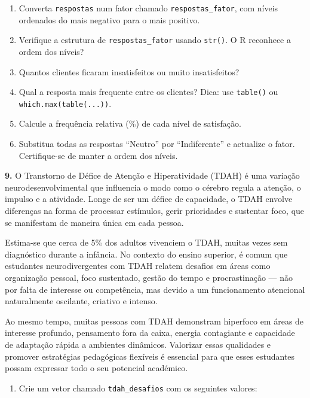 \documentclass[
]{book}
\providecommand{\tightlist}{%
  \setlength{\itemsep}{0pt}\setlength{\parskip}{0pt}}
\begin{document}
\begin{enumerate}
\def\labelenumi{(\alph{enumi})}
\setcounter{enumi}{1}
\item
  Converta \texttt{respostas} num fator chamado \texttt{respostas\_fator}, com níveis ordenados do mais negativo para o mais positivo.
\item
  Verifique a estrutura de \texttt{respostas\_fator} usando \texttt{str()}. O R reconhece a ordem dos níveis?
\item
  Quantos clientes ficaram insatisfeitos ou muito insatisfeitos?
\item
  Qual a resposta mais frequente entre os clientes? Dica: use \texttt{table()} ou \texttt{which.max(table(...))}.
\item
  Calcule a frequência relativa (\%) de cada nível de satisfação.
\item
  Substitua todas as respostas ``Neutro'' por ``Indiferente'' e actualize o fator. Certifique-se de manter a ordem dos níveis.
\end{enumerate}

\textbf{9.} O Transtorno de Défice de Atenção e Hiperatividade (TDAH) é uma variação neurodesenvolvimental que influencia o modo como o cérebro regula a atenção, o impulso e a atividade. Longe de ser um défice de capacidade, o TDAH envolve diferenças na forma de processar estímulos, gerir prioridades e sustentar foco, que se manifestam de maneira única em cada pessoa.

Estima-se que cerca de 5\% dos adultos vivenciem o TDAH, muitas vezes sem diagnóstico durante a infância. No contexto do ensino superior, é comum que estudantes neurodivergentes com TDAH relatem desafios em áreas como organização pessoal, foco sustentado, gestão do tempo e procrastinação --- não por falta de interesse ou competência, mas devido a um funcionamento atencional naturalmente oscilante, criativo e intenso.

Ao mesmo tempo, muitas pessoas com TDAH demonstram hiperfoco em áreas de interesse profundo, pensamento fora da caixa, energia contagiante e capacidade de adaptação rápida a ambientes dinâmicos. Valorizar essas qualidades e promover estratégias pedagógicas flexíveis é essencial para que esses estudantes possam expressar todo o seu potencial académico.

\begin{enumerate}
\def\labelenumi{(\alph{enumi})}
\tightlist
\item
  Crie um vetor chamado \texttt{tdah\_desafios} com os seguintes valores:
\end{enumerate}
\end{document}
